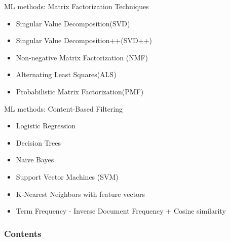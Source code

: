 \documentclass{beamer}
\begin{document}
\begin{frame}{ML methods: Matrix Factorization Techniques}
    \begin{itemize} 
        \item Singular Value Decomposition\hspace{0.8cm}(SVD)
        \item Singular Value Decomposition++\hspace{0.2cm}(SVD++)
        \item Non-negative Matrix Factorization (NMF)
        \item Alternating Least Squares\hspace{1.5cm}(ALS)
        \item Probabilistic Matrix Factorization\hspace{0.25cm}(PMF)
    \end{itemize}
\end{frame}

\begin{frame}{ML methods: Content-Based Filtering}
    \begin{itemize}  
        \item Logistic Regression
        \item Decision Trees
        \item Naive Bayes
        \item Support Vector Machines (SVM)
        \item K-Nearest Neighbors with feature vectors
        \item Term Frequency - Inverse Document Frequency + Cosine similarity
    \end{itemize}
\end{frame}

\begin{frame}
\frametitle{Contents}
\tableofcontents
\end{frame}
\end{document}
